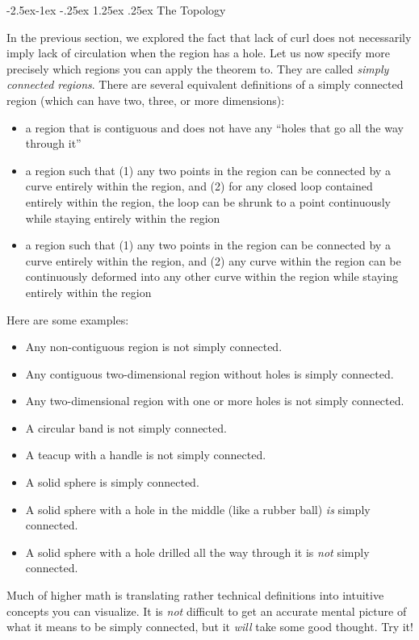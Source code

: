 \documentclass{myarticle}
\makeatletter
\newcommand\subsubsubsection{\@startsection{paragraph}{4}{\z@}%
            {-2.5ex\@plus -1ex \@minus -.25ex}%
            {1.25ex \@plus .25ex}%
            {\normalfont\normalsize\bfseries}}
\theoremstyle{nospace}
\newtheorem{old series theorem}{Theorem}
\newenvironment{series theorem}{\begin{mdframed}\begin{old series theorem}}{\end{old series theorem}\end{mdframed}}
\makeatother
\begin{document}
\subsubsubsection{The Topology} \label{sec:no curl topology}

In the previous section, we explored the fact that lack of curl does not necessarily imply lack of circulation when the region has a hole. Let us now specify more precisely which regions you can apply the theorem to. They are called \textit{simply connected regions}. There are several equivalent definitions of a simply connected region (which can have two, three, or more dimensions):

\begin{itemize}
\item a region that is contiguous and does not have any ``holes that go all the way through it''
\item a region such that (1) any two points in the region can be connected by a curve entirely within the region, and (2) for any closed loop contained entirely within the region, the loop can be shrunk to a point continuously while staying entirely within the region
\item a region such that (1) any two points in the region can be connected by a curve entirely within the region, and (2) any curve within the region can be continuously deformed into any other curve within the region while staying entirely within the region
\end{itemize}

Here are some examples:

\begin{itemize}
\item Any non-contiguous region is not simply connected.
\item Any contiguous two-dimensional region without holes is simply connected.
\item Any two-dimensional region with one or more holes is not simply connected.
\item A circular band is not simply connected.
\item A teacup with a handle is not simply connected.
\item A solid sphere is simply connected.
\item A solid sphere with a hole in the middle (like a rubber ball) \textit{is} simply connected.
\item A solid sphere with a hole drilled all the way through it is \textit{not} simply connected.
\end{itemize}

Much of higher math is translating rather technical definitions into intuitive concepts you can visualize. It is \textit{not} difficult to get an accurate mental picture of what it means to be simply connected, but it \textit{will} take some good thought. Try it!
\end{document}
